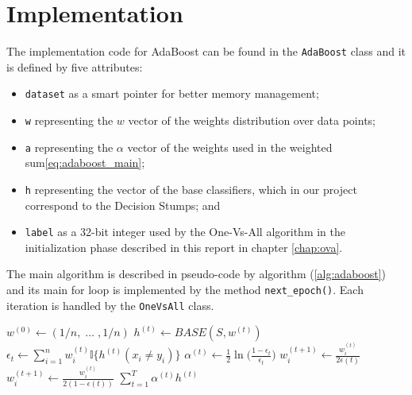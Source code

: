 	
\section{Implementation}
The implementation code for AdaBoost can be found in the \texttt{AdaBoost} class and it is defined by five attributes:
\begin{itemize}
	\item \texttt{dataset} as a smart pointer for better memory management;
	\item \texttt{w} representing the $w$ vector of the weights distribution over data points;
	\item \texttt{a} representing the $\alpha$ vector of the weights used in the weighted sum\ref{eq:adaboost_main};
	\item \texttt{h} representing the vector of the base classifiers, which in our project correspond to the Decision Stumps; and
	\item \texttt{label} as a 32-bit integer used by the One-Vs-All algorithm in the initialization phase described in this report in chapter \ref{chap:ova}.
\end{itemize}
The main algorithm is described in pseudo-code by algorithm (\ref{alg:adaboost}) and its main for loop is implemented by the method \texttt{next\_epoch()}. Each iteration is handled by the \texttt{OneVsAll} class.
\begin{algorithm}[htpb]
	\caption{}
	\label{alg:adaboost}
	\begin{algorithmic}[]
		\State $w^{(0)} \gets (1/n,\;\dots\;,1/n)$
			\State $h^{(t)} \gets BASE(S, w^{(t)})$
			\State $\epsilon_{t} \gets \sum_{i=1}^{n}w_{i}^{(t)}\mathbb{I}\lbrace h^{(t)}(x_{i} \neq y_{i}) \rbrace $
			\State $\alpha^{(t)} \gets \frac{1}{2}\ln\Big(\frac{1-\epsilon_{t}}{\epsilon_{t}}\Big)$
					\State $w_{i}^{(t+1)}\gets\frac{w_{i}^{(t)}}{2\epsilon{(t)}}$
				\Else
					\State $w_{i}^{(t+1)}\gets\frac{w_{i}^{(t)}}{2(1-\epsilon{(t)})}$
				\EndIf
			\EndFor
		\EndFor
		\Return $\sum_{t=1}^{T}\alpha^{(t)}h^{(t)}$
		\EndProcedure
	\end{algorithmic}
\end{algorithm}






